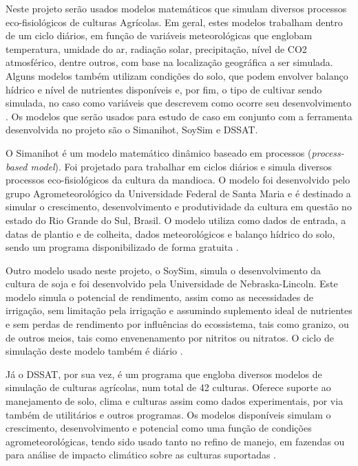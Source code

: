 \documentclass[tg]{mdtufsm}
\begin{document}
	Neste projeto serão usados modelos matemáticos que simulam diversos processos eco-fisiológicos de culturas Agrícolas. Em geral, estes modelos trabalham dentro de um ciclo diários, em função de variáveis meteorológicas que englobam temperatura, umidade do ar, radiação solar, precipitação, nível de CO2 atmosférico, dentre outros, com base na localização geográfica a ser simulada. Alguns modelos também utilizam condições do solo, que podem envolver balanço hídrico e nível de nutrientes disponíveis e, por fim, o tipo de cultivar sendo simulada, no caso como variáveis que descrevem como ocorre seu desenvolvimento \cite{simanihotArt}. Os modelos que serão usados para estudo de caso em conjunto com a ferramenta desenvolvida no projeto são o Simanihot, SoySim e DSSAT.

	O Simanihot é um modelo matemático dinâmico baseado em processos (\emph{process-based model}). Foi projetado para trabalhar em ciclos diários e simula diversos processos eco-fisiológicos da cultura da mandioca. O modelo foi desenvolvido pelo grupo Agrometeorológico da Universidade Federal de Santa Maria e é destinado a simular o crescimento, desenvolvimento e produtividade da cultura em questão no estado do Rio Grande do Sul, Brasil. O modelo utiliza como dados de entrada, a datas de plantio e de colheita, dados meteorológicos e balanço hídrico do solo, sendo um programa disponibilizado de forma gratuita \cite{Simanihot}.

	Outro modelo usado neste projeto, o SoySim, simula o desenvolvimento da cultura de soja e foi desenvolvido pela Universidade de Nebraska-Lincoln. Este modelo simula o potencial de rendimento, assim como as necessidades de irrigação, sem limitação pela irrigação e assumindo suplemento ideal de nutrientes e sem perdas de rendimento por influências do ecossistema, tais como granizo, ou de outros meios, tais como envenenamento por nitritos ou nitratos. O ciclo de simulação deste modelo também é diário \cite{SoySim}.
	
	Já o DSSAT, por sua vez, é um programa que engloba diversos modelos de simulação de culturas agrícolas, num total de 42 culturas. Oferece suporte ao manejamento de solo, clima e culturas assim como dados experimentais, por via também de utilitários e outros programas. Os modelos disponíveis simulam o crescimento, desenvolvimento e potencial como uma função de condições agrometeorológicas, tendo sido usado tanto no refino de manejo, em fazendas ou para análise de impacto climático sobre as culturas suportadas \cite{dssat}.
	
\end{document}
